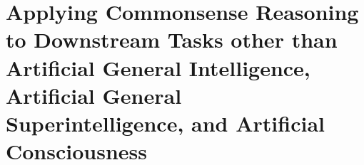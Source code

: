 \chapter{Applying Commonsense Reasoning to Downstream Tasks other than Artificial General Intelligence, Artificial General Superintelligence, and Artificial Consciousness}
